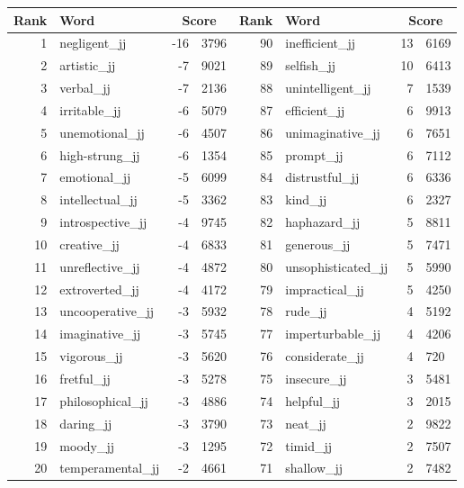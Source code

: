 \begin{table}[tbp]
    \begin{tabular}{| rlr@{.}l | rlr@{.}l |}
    \hline
    \textbf{Rank} & \textbf{Word} & \multicolumn{2}{c|}{\textbf{Score}} & \textbf{Rank} & \textbf{Word} & \multicolumn{2}{c|}{\textbf{Score}} \\
    \hline
    1 & negligent\_jj & -16 & 3796    &    90 & inefficient\_jj & 13 & 6169 \\
    2 & artistic\_jj & -7 & 9021    &    89 & selfish\_jj & 10 & 6413 \\
    3 & verbal\_jj & -7 & 2136    &    88 & unintelligent\_jj & 7 & 1539 \\
    4 & irritable\_jj & -6 & 5079    &    87 & efficient\_jj & 6 & 9913 \\
    5 & unemotional\_jj & -6 & 4507    &    86 & unimaginative\_jj & 6 & 7651 \\
    6 & high-strung\_jj & -6 & 1354    &    85 & prompt\_jj & 6 & 7112 \\
    7 & emotional\_jj & -5 & 6099    &    84 & distrustful\_jj & 6 & 6336 \\
    8 & intellectual\_jj & -5 & 3362    &    83 & kind\_jj & 6 & 2327 \\
    9 & introspective\_jj & -4 & 9745    &    82 & haphazard\_jj & 5 & 8811 \\
    10 & creative\_jj & -4 & 6833    &    81 & generous\_jj & 5 & 7471 \\
    11 & unreflective\_jj & -4 & 4872    &    80 & unsophisticated\_jj & 5 & 5990 \\
    12 & extroverted\_jj & -4 & 4172    &    79 & impractical\_jj & 5 & 4250 \\
    13 & uncooperative\_jj & -3 & 5932    &    78 & rude\_jj & 4 & 5192 \\
    14 & imaginative\_jj & -3 & 5745    &    77 & imperturbable\_jj & 4 & 4206 \\
    15 & vigorous\_jj & -3 & 5620    &    76 & considerate\_jj & 4 & 720 \\
    16 & fretful\_jj & -3 & 5278    &    75 & insecure\_jj & 3 & 5481 \\
    17 & philosophical\_jj & -3 & 4886    &    74 & helpful\_jj & 3 & 2015 \\
    18 & daring\_jj & -3 & 3790    &    73 & neat\_jj & 2 & 9822 \\
    19 & moody\_jj & -3 & 1295    &    72 & timid\_jj & 2 & 7507 \\
    20 & temperamental\_jj & -2 & 4661    &    71 & shallow\_jj & 2 & 7482 \\

\end{tabular}
\end{table}
